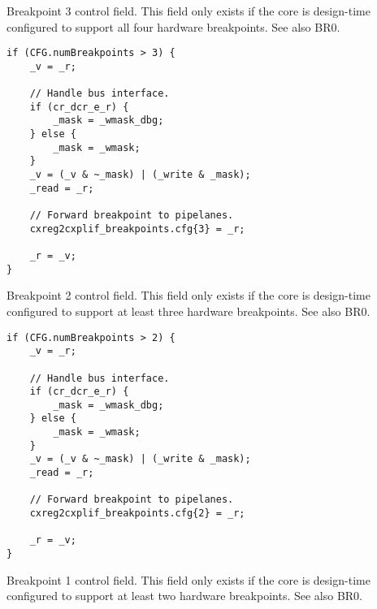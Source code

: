 Breakpoint 3 control field. This field only exists if the core is design-time
configured to support all four hardware breakpoints. See also BR0.

\declaration{}
\implementation{}
\begin{lstlisting}
if (CFG.numBreakpoints > 3) {
    _v = _r;

    // Handle bus interface.
    if (cr_dcr_e_r) {
        _mask = _wmask_dbg;
    } else {
        _mask = _wmask;
    }
    _v = (_v & ~_mask) | (_write & _mask);
    _read = _r;
    
    // Forward breakpoint to pipelanes.
    cxreg2cxplif_breakpoints.cfg{3} = _r;
    
    _r = _v;
}
\end{lstlisting}

Breakpoint 2 control field. This field only exists if the core is design-time
configured to support at least three hardware breakpoints. See also BR0.

\declaration{}
\implementation{}
\begin{lstlisting}
if (CFG.numBreakpoints > 2) {
    _v = _r;

    // Handle bus interface.
    if (cr_dcr_e_r) {
        _mask = _wmask_dbg;
    } else {
        _mask = _wmask;
    }
    _v = (_v & ~_mask) | (_write & _mask);
    _read = _r;
    
    // Forward breakpoint to pipelanes.
    cxreg2cxplif_breakpoints.cfg{2} = _r;
    
    _r = _v;
}
\end{lstlisting}

Breakpoint 1 control field. This field only exists if the core is design-time
configured to support at least two hardware breakpoints. See also BR0.

